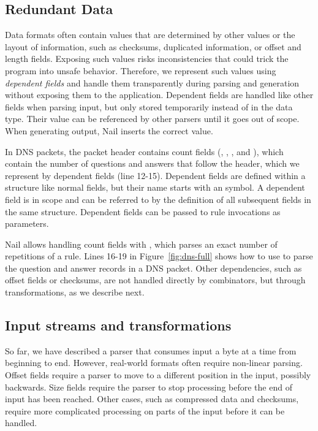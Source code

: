 


\subsection{Redundant Data}
\label{s:dependent}
Data formats often contain values that are determined by other values or the layout of information,
such as checksums, duplicated information, or offset and  length fields. Exposing such values risks
inconsistencies that could trick the program into unsafe behavior. Therefore, we represent such values using \emph{dependent fields} and handle them transparently during
parsing and generation without exposing them to the application. 
Dependent fields are handled like other fields when parsing input, but only stored temporarily
instead of in the data type. Their value can be referenced by other parsers until it goes out of scope.
When generating output, Nail inserts the correct value.

In DNS packets, the packet header contains count fields (,
, , and ), which contain the number of questions and answers that follow the
header, which we represent by dependent fields (line 12-15).
Dependent fields are defined within a structure like normal fields, but their name starts with an  symbol.
A dependent field is in scope and can be referred to by the definition of all subsequent fields in
the same structure. Dependent fields can be passed to rule invocations as parameters.


Nail allows handling count fields with , which parses an exact number of repetitions of a rule. Lines 16-19 in Figure~\ref{fig:dns-full} shows how to use  to parse the question and
answer records in a DNS packet.
Other dependencies, such as offset fields or checksums, are not handled directly by combinators, but
through  transformations, as we describe next.

\subsection{Input streams and transformations}
\label{s:transforms}
So far, we have described a parser that consumes input a byte at a time from beginning to end.
However, real-world formats often require non-linear parsing. Offset fields require a parser to move
to a different position in the input, possibly backwards. Size fields require the parser to stop
processing before the end of input has been reached.
Other cases, such as compressed data and checksums, require more complicated processing on parts of the input
before it can be handled.


